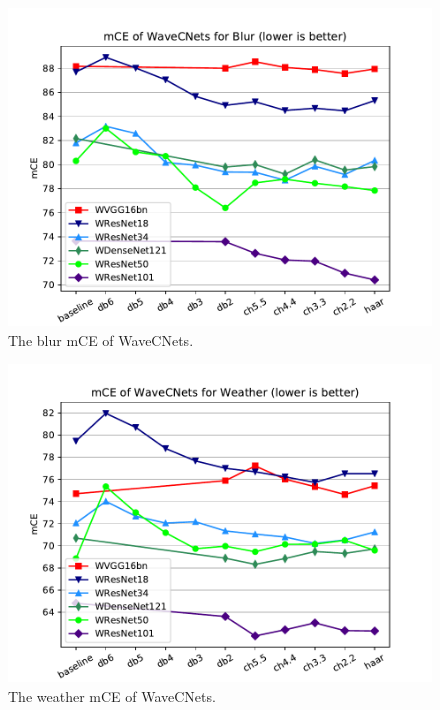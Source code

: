 \begin{figure}[bpt]
	\centering
	\includegraphics*[scale=0.6, viewport=23 4 416 320]{figures/mCE_blur.pdf}
	\caption{The blur mCE of WaveCNets.}
	\label{fig_mCE_blur}
\end{figure}
\begin{figure}[bpt]
	\centering
	\includegraphics*[scale=0.6, viewport=23 4 416 320]{figures/mCE_weather.pdf}
	\caption{The weather mCE of WaveCNets.}
	\label{fig_mCE_weather}
\end{figure}
